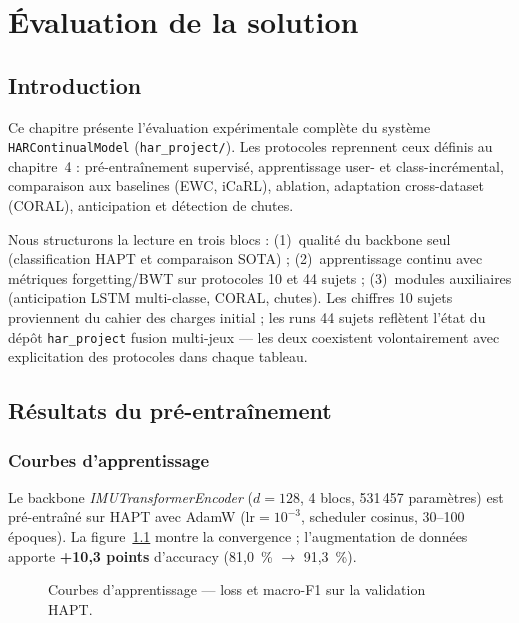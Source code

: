 \chapter{Évaluation de la solution}
\label{ch:11-Evaluation}

\section{Introduction}

Ce chapitre présente l'évaluation expérimentale complète du système
\texttt{HARContinualModel} (\texttt{har\_project/}). Les protocoles reprennent
ceux définis au chapitre~4 : pré-entraînement supervisé, apprentissage
user- et class-incrémental, comparaison aux baselines (EWC, iCaRL), ablation,
adaptation cross-dataset (CORAL), anticipation et détection de chutes.

Nous structurons la lecture en trois blocs : (1)~qualité du backbone seul
(classification HAPT et comparaison SOTA) ; (2)~apprentissage continu avec
métriques forgetting/BWT sur protocoles 10 et 44 sujets ; (3)~modules auxiliaires
(anticipation LSTM multi-classe, CORAL, chutes). Les chiffres 10 sujets proviennent du
cahier des charges initial ; les runs 44 sujets reflètent l'état du dépôt
\texttt{har\_project} fusion multi-jeux — les deux coexistent volontairement avec
explicitation des protocoles dans chaque tableau.

\section{Résultats du pré-entraînement}

\subsection{Courbes d'apprentissage}

Le backbone \emph{IMUTransformerEncoder} ($d=128$, 4 blocs, 531\,457 paramètres)
est pré-entraîné sur HAPT avec AdamW ($\mathrm{lr}=10^{-3}$, scheduler cosinus,
30--100 époques). La figure~\ref{fig:pretrain} montre la convergence ; l'augmentation
de données apporte \textbf{+10,3 points} d'accuracy (81,0~\% $\rightarrow$ 91,3~\%).

\begin{figure}[H]
  \centering
  \caption[Courbes d'apprentissage du backbone]{Courbes d'apprentissage — loss et macro-F1
  sur la validation HAPT.}
  \label{fig:pretrain}
\end{figure}

